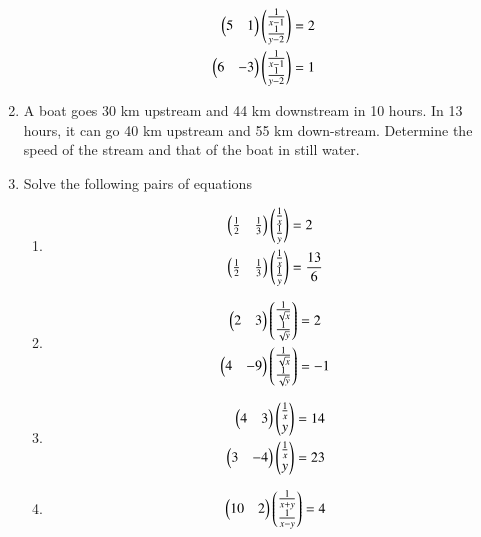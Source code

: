 \begin{enumerate}[label=\arabic*.,ref=\thesubsection.\theenumi]
%
\begin{align}
\begin{split}
\begin{pmatrix}5 & 1 \end{pmatrix}\begin{pmatrix}\frac{1}{x-1} \\ \frac{1}{y-2}\end{pmatrix}&=2
\\
\begin{pmatrix}6 & -3 \end{pmatrix}\begin{pmatrix}\frac{1}{x-1} \\ \frac{1}{y-2}\end{pmatrix}&=1
\end{split}
\end{align}
%
\item A boat goes 30 km upstream and 44 km downstream in 10 hours. In 13 hours, it can go 40 km upstream and 55 km down-stream. Determine the speed of the stream and that of the boat in still water.
%
%
\item Solve the following pairs of equations
%
\begin{enumerate}[itemsep=2pt]
\item
\begin{align}
\begin{split}
\begin{pmatrix}\frac{1}{2} & \frac{1}{3} \end{pmatrix}\begin{pmatrix}\frac{1}{x} \\ \frac{1}{y}\end{pmatrix}&=2
\\
\begin{pmatrix}\frac{1}{2} & \frac{1}{3} \end{pmatrix}\begin{pmatrix}\frac{1}{x} \\ \frac{1}{y}\end{pmatrix}&=\frac{13}{6}
\end{split}
\end{align}
\item
\begin{align}
\begin{split}
\begin{pmatrix}2 & 3 \end{pmatrix}\begin{pmatrix}\frac{1}{\sqrt{x}} \\ \frac{1}{\sqrt{y}}\end{pmatrix}&=2
\\
\begin{pmatrix}4 & -9\end{pmatrix}\begin{pmatrix}\frac{1}{\sqrt{x}} \\ \frac{1}{\sqrt{y}}\end{pmatrix}&=-1
\end{split}
\end{align}
\item
\begin{align}
\begin{split}
\begin{pmatrix}4 & 3 \end{pmatrix}\begin{pmatrix}\frac{1}{x} \\ y\end{pmatrix}&=14
\\
\begin{pmatrix}3 & -4\end{pmatrix}\begin{pmatrix}\frac{1}{x} \\ y\end{pmatrix}&=23
\end{split}
\end{align}
\item
\begin{align}
\begin{split}
\myvec{10 & 2 }\myvec{\frac{1}{x+y} \\ \frac{1}{x-y}}&=4\\

\end{split}
\end{align}
\end{enumerate}
\end{enumerate}
